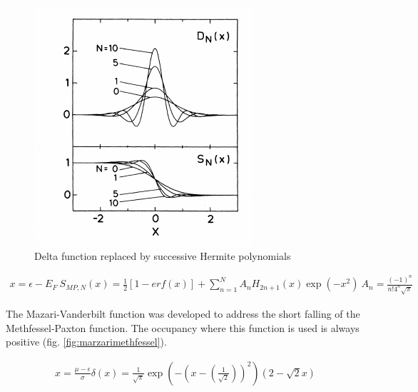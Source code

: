 \begin{figure}
\centering
\begin{minipage}{.65\textwidth}
\centering
    \includegraphics[width=.8\linewidth]{chapters/interatomic_potential_fitting/images/methfesselpaxton.png}
    \caption{Delta function replaced by successive Hermite polynomials\cite{methfesslpaxton}}
    \label{fig:deltahermite}
\end{minipage}
\end{figure}

\begin{equation}
\begin{split}
x = \epsilon - E_F \
S_{MP,N}(x) = \frac{1}{2} \left[1 - erf\left(x\right)\right] + \sum_{n=1}^{N} A_n H_{2n+1}(x)\exp(-x^2)\
A_n = \frac{(-1)^n}{n! 4^n \sqrt{\pi}}
\end{split}
\label{eq:methfesselpaxton}
\end{equation}

The Mazari-Vanderbilt function was developed to address the short falling of the Methfessel-Paxton function.  The occupancy where this function is used is always positive (fig. \ref{fig:marzarimethfessel}).

\begin{equation}
\begin{split}
x = \frac{\mu-\epsilon}{\sigma}
\delta(x) = \frac{1}{\sqrt{\pi}} \exp(-(x-(\frac{1}{\sqrt{2}}))^2) (2-\sqrt{2} x)
\end{split}
\label{eq:methfesselpaxton}
\end{equation}

